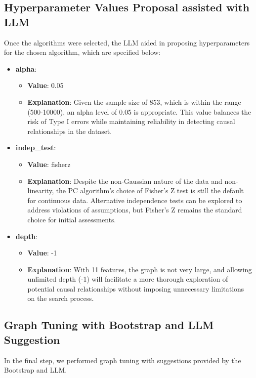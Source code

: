 \documentclass{article}
\begin{document}
\subsection{Hyperparameter Values Proposal assisted with LLM}
Once the algorithms were selected, the LLM aided in proposing hyperparameters 
for the chosen algorithm, which are specified below:
        
\begin{itemize}

\item \textbf{alpha}:
\begin{itemize}
    \item \textbf{Value}: 0.05
    \item \textbf{Explanation}: Given the sample size of 853, which is within the range (500-10000), an alpha level of 0.05 is appropriate. This value balances the risk of Type I errors while maintaining reliability in detecting causal relationships in the dataset.
\end{itemize}

\item \textbf{indep\_test}:
\begin{itemize}
    \item \textbf{Value}: fisherz
    \item \textbf{Explanation}: Despite the non-Gaussian nature of the data and non-linearity, the PC algorithm's choice of Fisher's Z test is still the default for continuous data. Alternative independence tests can be explored to address violations of assumptions, but Fisher's Z remains the standard choice for initial assessments.
\end{itemize}

\item \textbf{depth}:
\begin{itemize}
    \item \textbf{Value}: -1
    \item \textbf{Explanation}: With 11 features, the graph is not very large, and allowing unlimited depth (-1) will facilitate a more thorough exploration of potential causal relationships without imposing unnecessary limitations on the search process.
\end{itemize}

\end{itemize}
                    

\subsection{Graph Tuning with Bootstrap and LLM Suggestion}
In the final step, we performed graph tuning with suggestions provided by the Bootstrap and LLM.
            
\end{document}
